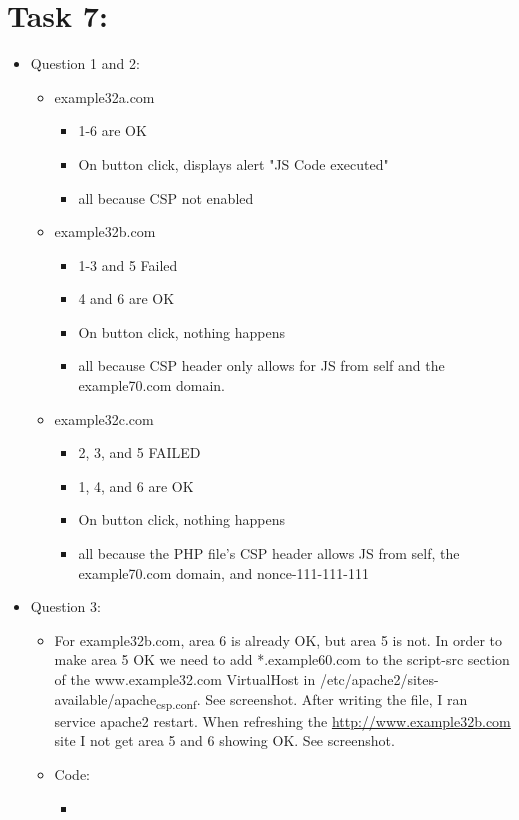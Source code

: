\documentclass[11pt]{article}
\begin{document}
\section*{Task 7:}
\label{sec:org1a08f56}
\begin{itemize}
\item Question 1 and 2:
\begin{itemize}
\item example32a.com
\begin{itemize}
\item 1-6 are OK
\item On button click, displays alert "JS Code executed"
\item all because CSP not enabled
\end{itemize}
\item example32b.com
\begin{itemize}
\item 1-3 and 5 Failed
\item 4 and 6 are OK
\item On button click, nothing happens
\item all because CSP header only allows for JS from self and the example70.com domain.
\end{itemize}
\item example32c.com
\begin{itemize}
\item 2, 3, and 5 FAILED
\item 1, 4, and 6 are OK
\item On button click, nothing happens
\item all because the PHP file's CSP header allows JS from self, the example70.com domain, and nonce-111-111-111
\end{itemize}
\end{itemize}
\item Question 3:
\begin{itemize}
\item For example32b.com, area 6 is already OK, but area 5 is not. In order to make area 5 OK we need to add *.example60.com to the script-src section of the www.example32.com VirtualHost in /etc/apache2/sites-available/apache\textsubscript{csp.conf}. See screenshot. After writing the file, I ran service apache2 restart. When refreshing the \url{http://www.example32b.com} site I not get area 5 and 6 showing OK. See screenshot.
\item Code:
\begin{itemize}
\item \begin{center}

\end{center}
\end{itemize}
\end{itemize}
\end{itemize}
\end{document}
